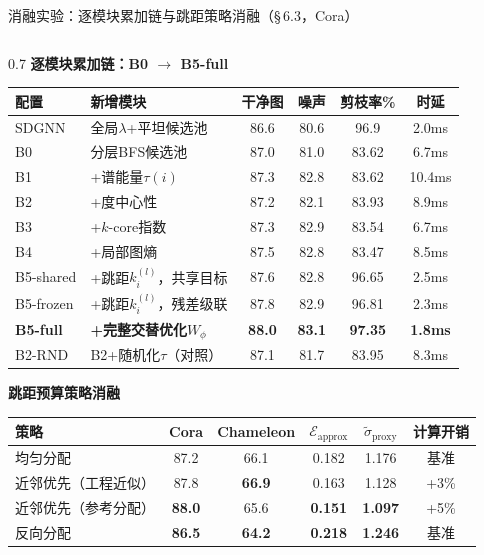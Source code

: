 \documentclass[aspectratio=169,9pt,xcolor=dvipsnames]{beamer}
\newcommand{\highlight}[1]{\textcolor{myred}{\textbf{#1}}}
\newcommand{\blue}[1]{\textcolor{mynavy}{#1}}
\newcommand{\green}[1]{\textcolor{mygreen}{#1}}
\begin{document}
\begin{frame}{消融实验：逐模块累加链与跳距策略消融（§\,6.3，Cora）}
\begin{columns}[T]

\begin{column}{0.7\textwidth}
  \textbf{\blue{逐模块累加链：B0 $\to$ B5-full}}

  {
  \begin{tabular}{llcccc}
    \toprule
    配置 & 新增模块 & 干净图 & 噪声 & 剪枝率\% & 时延 \\
    \midrule
    SDGNN & 全局$\lambda$+平坦候选池 & 86.6 & 80.6 & 96.9 & 2.0ms \\
    B0 & 分层BFS候选池 & 87.0 & 81.0 & 83.62 & 6.7ms \\
    B1 & +谱能量$\tau(i)$ & 87.3 & 82.8 & 83.62 & 10.4ms \\
    B2 & +度中心性 & 87.2 & 82.1 & 83.93 & 8.9ms \\
    B3 & +$k$-core指数 & 87.3 & 82.9 & 83.54 & 6.7ms \\
    B4 & +局部图熵 & 87.5 & 82.8 & 83.47 & 8.5ms \\
    B5-shared & +跳距$k_i^{(l)}$，共享目标 & 87.6 & 82.8 & 96.65 & 2.5ms \\
    B5-frozen & +跳距$k_i^{(l)}$，残差级联 & 87.8 & 82.9 & 96.81 & 2.3ms \\
    \textbf{B5-full} & \textbf{+完整交替优化$W_\phi$}& \textbf{88.0} & \textbf{83.1} & \textbf{97.35} & \textbf{1.8ms} \\
    \midrule
    B2-RND & B2+随机化$\tau$（对照） & 87.1 & 81.7 & 83.95 & 8.3ms \\
    \bottomrule
  \end{tabular}
  }

  \textbf{\blue{跳距预算策略消融}}

  {
  \begin{tabular}{lccccc}
    \toprule
    策略 & Cora & Chameleon & $\mathcal{E}_{\mathrm{approx}}$ & $\widetilde{\sigma}_{\mathrm{proxy}}$ & 计算开销 \\
    \midrule
    均匀分配 & 87.2 & 66.1 & 0.182 & 1.176 & 基准 \\
    近邻优先（工程近似） & 87.8 & \green{\textbf{66.9}} & 0.163 & 1.128 & +3\% \\
    近邻优先（参考分配） & \green{\textbf{88.0}} & 65.6 & \green{\textbf{0.151}} & \green{\textbf{1.097}} & +5\% \\
    反向分配 & \highlight{86.5} & \highlight{64.2} & \highlight{0.218} & \highlight{1.246} & 基准 \\
    \bottomrule
  \end{tabular}
  }
\end{column}
\hfill


\end{columns}
\end{frame}
\end{document}
